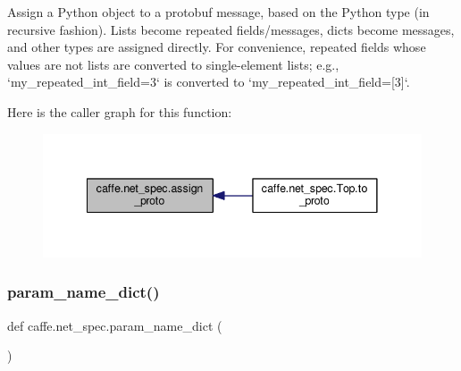 \begin{DoxyVerb}Assign a Python object to a protobuf message, based on the Python
type (in recursive fashion). Lists become repeated fields/messages, dicts
become messages, and other types are assigned directly. For convenience,
repeated fields whose values are not lists are converted to single-element
lists; e.g., `my_repeated_int_field=3` is converted to
`my_repeated_int_field=[3]`.\end{DoxyVerb}
 Here is the caller graph for this function\+:
\nopagebreak
\begin{figure}[H]
\begin{center}
\leavevmode
\includegraphics[width=341pt]{namespacecaffe_1_1net__spec_a823515c8ca21e9562ea594546e167da2_icgraph}
\end{center}
\end{figure}
\mbox{\label{namespacecaffe_1_1net__spec_a743950197e4a2ce816bcc4ec5bb04968}} 
\subsubsection{\texorpdfstring{param\+\_\+name\+\_\+dict()}{param\_name\_dict()}}
{\footnotesize\ttfamily def caffe.\+net\+\_\+spec.\+param\+\_\+name\+\_\+dict (\begin{DoxyParamCaption}{ }\end{DoxyParamCaption})}

